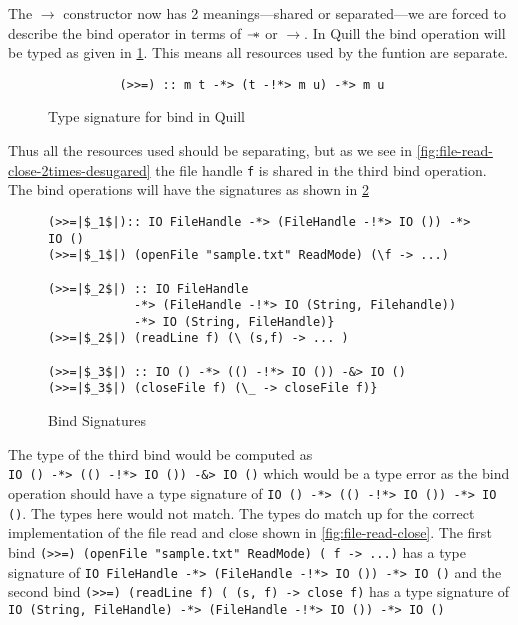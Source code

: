 The $\rightarrow$ constructor now has 2 meanings---shared or separated---we are
forced to describe the bind operator in terms of $\mathrel{-\mkern-6mu*}$ or $\rightarrow$. In Quill the bind operation will
be typed as given in \cref{fig:quill-bind-type}. This means all resources used by the funtion are separate.
\begin{figure}[h]
  \begin{framed}
    \begin{verbatim}
          (>>=) :: m t -*> (t -!*> m u) -*> m u
    \end{verbatim}
  \end{framed}
  \caption{Type signature for bind in Quill}
  \label{fig:quill-bind-type}
\end{figure}
Thus all the resources used should be separating, but as we see in \cref{fig:file-read-close-2times-desugared} the file handle
\texttt{f} is shared in the third bind operation.
The bind operations will have the signatures as shown in \cref{fig:bind-signatures}
\begin{figure}[h]
\begin{framed}
\begin{verbatim}
(>>=|$_1$|):: IO FileHandle -*> (FileHandle -!*> IO ()) -*> IO ()
(>>=|$_1$|) (openFile "sample.txt" ReadMode) (\f -> ...)

(>>=|$_2$|) :: IO FileHandle
            -*> (FileHandle -!*> IO (String, Filehandle))
            -*> IO (String, FileHandle)}
(>>=|$_2$|) (readLine f) (\ (s,f) -> ... )

(>>=|$_3$|) :: IO () -*> (() -!*> IO ()) -&> IO ()
(>>=|$_3$|) (closeFile f) (\_ -> closeFile f)}
\end{verbatim}
\end{framed}
\caption{Bind Signatures}
\label{fig:bind-signatures}
\end{figure}

The type of the third bind would be computed as \\
\texttt{IO () -*> (() -!*> IO ()) -&> IO ()} which would be a type error
as the bind operation should have a type signature of
\texttt{IO () -*> (() -!*> IO ()) -*> IO ()}. The types here would not match.
The types do match up for the correct implementation of the file read and close shown in \cref{fig:file-read-close}.
The first bind \texttt{(>>=) (openFile "sample.txt" ReadMode) (\ f -> ...)} has a type signature of
\texttt{IO FileHandle -*> (FileHandle -!*> IO ()) -*> IO ()} and the second bind
\texttt{(>>=) (readLine f) (\ (s, f) -> close f)} has a type signature of\\
\texttt{IO (String, FileHandle) -*> (FileHandle -!*> IO ()) -*> IO ()}

